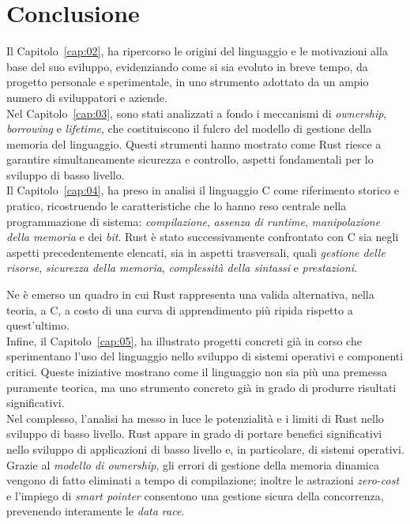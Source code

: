
\chapter{Conclusione}\label{cap:06}
Il Capitolo~\ref{cap:02}, ha ripercorso le origini del linguaggio e le motivazioni alla base del suo sviluppo, 
evidenziando come si sia evoluto in breve tempo, da progetto personale e sperimentale, in uno strumento adottato da un ampio numero di sviluppatori e aziende. \hfill
\vspace{10pt}\\
\noindent Nel Capitolo~\ref{cap:03}, sono stati analizzati a fondo i meccanismi di \textit{ownership}, \textit{borrowing} e \textit{lifetime}, che costituiscono 
il fulcro del modello di gestione della memoria del linguaggio. 
Questi strumenti hanno mostrato come Rust riesce a garantire simultaneamente sicurezza e controllo, aspetti
fondamentali per lo sviluppo di basso livello. \hfill
\vspace{10pt}\\
\noindent Il Capitolo~\ref{cap:04}, ha preso in analisi il linguaggio C come riferimento
storico e pratico, ricostruendo le caratteristiche che lo hanno reso centrale nella programmazione di sistema: 
\textit{compilazione}, \textit{assenza di runtime}, \textit{manipolazione della memoria} e dei \textit{bit}.
Rust è stato successivamente confrontato con C sia negli aspetti precedentemente elencati, sia in 
aspetti trasversali, quali \textit{gestione delle risorse}, \textit{sicurezza della memoria}, \textit{complessità della sintassi} e \textit{prestazioni}.

Ne è emerso un quadro in cui Rust rappresenta una valida alternativa, nella teoria, a C, 
a costo di una curva di apprendimento più ripida rispetto a quest'ultimo. \hfill
\vspace{10pt}\\
\noindent Infine, il Capitolo~\ref{cap:05}, ha illustrato progetti
concreti già in corso che sperimentano l'uso del linguaggio nello sviluppo di sistemi operativi e 
componenti critici. Queste iniziative mostrano come il linguaggio non sia più una 
premessa puramente teorica, ma uno strumento concreto già in grado di produrre risultati significativi. \hfill
\vspace{10pt}\\
\noindent Nel complesso, l'analisi ha messo in luce le potenzialità e i limiti di Rust nello sviluppo di 
basso livello.
Rust appare in grado di portare benefici significativi nello sviluppo di applicazioni di basso livello e, in particolare, di sistemi operativi.
Grazie al \textit{modello di ownership}, gli errori di gestione della memoria dinamica vengono di fatto eliminati a tempo di compilazione; inoltre 
le astrazioni \textit{zero-cost} e l'impiego di \textit{smart pointer} consentono una gestione sicura della concorrenza, prevenendo interamente le \textit{data race}.

